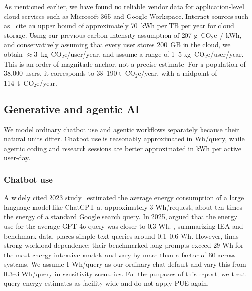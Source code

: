 \documentclass[11pt]{article}
\let\cite\parencite
\newcommand{\coe}{CO$_2$e}
\newcommand{\gcoe}{g~\coe}
\newcommand{\tcoe}{t~\coe}
\newcommand{\kgcoe}{k\gcoe}
\newcommand{\gcoekwh}{\gcoe\ / kWh}
\begin{document}
As mentioned earlier, we have found no reliable vendor data for
application-level cloud services such as Microsoft 365 and Google Workspace.
Internet sources such as~\textcite{ecoflow:2025} cite an upper bound of
approximately 70~kWh per TB per year for cloud storage. Using our previous
carbon intensity assumption of 207 \gcoekwh, and conservatively assuming that
every user stores 200~GB in the cloud, we obtain $\approx 3$~\kgcoe/user/year,
and assume a range of 1--5 \kgcoe/user/year. This is an order-of-magnitude
anchor, not a precise estimate. For a population of 38,000 users, it corresponds
to 38--190 \tcoe/year, with a midpoint of 114~\tcoe/year.

\subsection{Generative and agentic AI}

We model ordinary chatbot use and agentic workflows separately because their
natural units differ. Chatbot use is reasonably approximated in Wh/query, while
agentic coding and research sessions are better approximated in kWh per active
user-day.

\subsubsection*{Chatbot use}

A widely cited 2023 study~\cite{devries2023growing} estimated the average energy
consumption of a large language model like ChatGPT at approximately 3
Wh/request, about ten times the energy of a standard Google search query. In
2025, \textcite{epoch2025howmuchenergydoeschatgptuse} argued that the energy use
for the average GPT-4o query was closer to 0.3 Wh.
\textcite{ritchie:ai:electricity:2026}, summarizing IEA and benchmark data,
places simple text queries around 0.1--0.6 Wh. However,
\textcite{jegham2025hungry} finds strong workload dependence: their benchmarked
long prompts exceed 29 Wh for the most energy-intensive models and vary by more
than a factor of 60 across systems. We assume 1 Wh/query as our ordinary-chat
default and vary this from 0.3--3 Wh/query in sensitivity scenarios. For the
purposes of this report, we treat query energy estimates as facility-wide and do
not apply PUE again.
\end{document}
